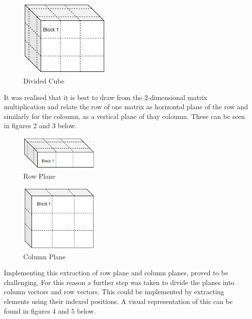 \documentclass[a4paper, 11pt, onecolumn, conference]{IEEEtran}      %
\begin{document}
\begin{figure}[H]
\centering
\includegraphics[width=0.4\textwidth]{MatrixBlock.JPG}%
\caption{Divided Cube}
\label{fig:1}
\end{figure}

It was realised that it is best to draw from the 2-dimensional matrix multiplication and relate the row of one matrix as horizontal plane of the row and similarly for the coloumn, as a vertical plane of thay coloumn. These can be seen in figures 2 and 3 below.

\begin{figure}[H]
\centering
\includegraphics[width=0.35\textwidth]{VPlaneBlock.JPG}%
\caption{Row Plane}
\label{fig:2}
\end{figure}

\begin{figure}[H]
\centering
\includegraphics[width=0.35\textwidth]{MatrixPlane.JPG}%
\caption{Column Plane}
\label{fig:3}
\end{figure}

Implementing this extraction of row plane and column planes, proved to be challenging. For this reason a further step was taken to divide the planes into column vectors and row vectors. This could be implemented by extracting elements using their indexed positions. A visual representation of this can be found in figures 4 and 5 below.
\end{document}
